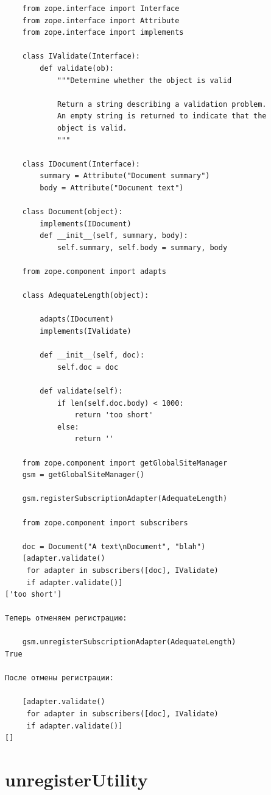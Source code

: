 \documentclass[a4paper,openany,twoside,final]{book}
\begin{document}
\begin{verbatim}
    from zope.interface import Interface
    from zope.interface import Attribute
    from zope.interface import implements

    class IValidate(Interface):
        def validate(ob):
            """Determine whether the object is valid

            Return a string describing a validation problem.
            An empty string is returned to indicate that the
            object is valid.
            """

    class IDocument(Interface):
        summary = Attribute("Document summary")
        body = Attribute("Document text")

    class Document(object):
        implements(IDocument)
        def __init__(self, summary, body):
            self.summary, self.body = summary, body

    from zope.component import adapts

    class AdequateLength(object):

        adapts(IDocument)
        implements(IValidate)

        def __init__(self, doc):
            self.doc = doc

        def validate(self):
            if len(self.doc.body) < 1000:
                return 'too short'
            else:
                return ''

    from zope.component import getGlobalSiteManager
    gsm = getGlobalSiteManager()

    gsm.registerSubscriptionAdapter(AdequateLength)

    from zope.component import subscribers

    doc = Document("A text\nDocument", "blah")
    [adapter.validate()
     for adapter in subscribers([doc], IValidate)
     if adapter.validate()]
['too short']

Теперь отменяем регистрацию:

    gsm.unregisterSubscriptionAdapter(AdequateLength)
True

После отмены регистрации:

    [adapter.validate()
     for adapter in subscribers([doc], IValidate)
     if adapter.validate()]
[]
\end{verbatim}


\section*{unregisterUtility%
  \label{unregisterutility}%
}
\end{document}
